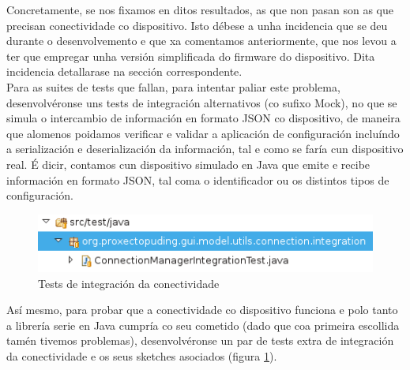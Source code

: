  Concretamente, se nos fixamos en ditos resultados, as que non pasan son as
 que precisan conectividade co dispositivo. Isto débese a unha incidencia que se
 deu durante o desenvolvemento e que xa comentamos anteriormente, que nos levou
 a ter que empregar unha versión simplificada do firmware do dispositivo. Dita
 incidencia detallarase na sección correspondente. \\
 
 Para as suites de tests que fallan, para intentar paliar este problema,
 desenvolvéronse uns tests de integración alternativos (co sufixo Mock), no que
 se simula o intercambio de información en formato JSON co dispositivo, de
 maneira que alomenos poidamos verificar e validar a aplicación de configuración
 incluíndo a serialización e deserialización da información, tal e como se faría
 cun dispositivo real. É dicir, contamos cun dispositivo simulado en Java que
 emite e recibe información en formato JSON, tal coma o identificador ou os
 distintos tipos de configuración. \\
 
 \begin{figure}[htbp]
  \centering
  \includegraphics[scale=0.8,keepaspectratio=true]{./imagenes/tests-integracion-conectividade.png}
  \caption{Tests de integración da conectividade}
  \label{figura:TestsIntegracionConectividade}
 \end{figure}
  
 Así mesmo, para probar que a conectividade co dispositivo funciona e polo
 tanto a librería serie en Java cumpría co seu cometido (dado que coa primeira
 escollida tamén tivemos problemas), desenvolvéronse un par de tests extra de
 integración da conectividade e os seus sketches asociados (figura
 \ref{figura:TestsIntegracionConectividade}). \\
  

